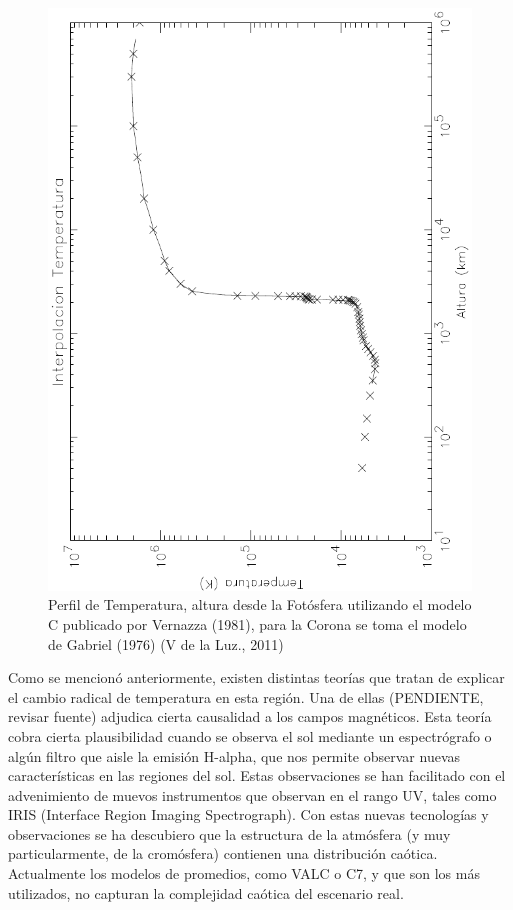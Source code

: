 \documentclass[9pt]{book}
\begin{document}
\begin{figure}[h]
\centering
\includegraphics[scale=.8]{Temperatura}
\caption{ Perfil de Temperatura, altura desde la Fot\'osfera utilizando el modelo C publicado por Vernazza (1981), para la Corona se toma el modelo de Gabriel (1976) (V de la Luz., 2011) }
\label{t_cromosfera}
\end{figure}


Como se mencion\'o anteriormente, existen distintas teor\'ias que tratan de explicar el cambio radical de temperatura en esta regi\'on. Una de ellas (PENDIENTE, revisar fuente) adjudica cierta causalidad a los campos magn\'eticos. Esta teor\'ia cobra cierta plausibilidad cuando se observa el sol mediante un espectr\'ografo o alg\'un filtro que aisle la emisi\'on H-alpha, que nos permite observar nuevas caracter\'isticas en las regiones del sol. Estas observaciones se han facilitado con el advenimiento de muevos instrumentos que observan en el rango UV, tales como IRIS (Interface Region Imaging Spectrograph). Con estas nuevas tecnolog\'ias y observaciones se ha descubiero que la estructura de la atm\'osfera (y muy particularmente, de la crom\'osfera) contienen una distribuci\'on ca\'otica. Actualmente los modelos de promedios, como VALC o C7, y que son los m\'as utilizados, no capturan la complejidad ca\'otica del escenario real.
\end{document}
